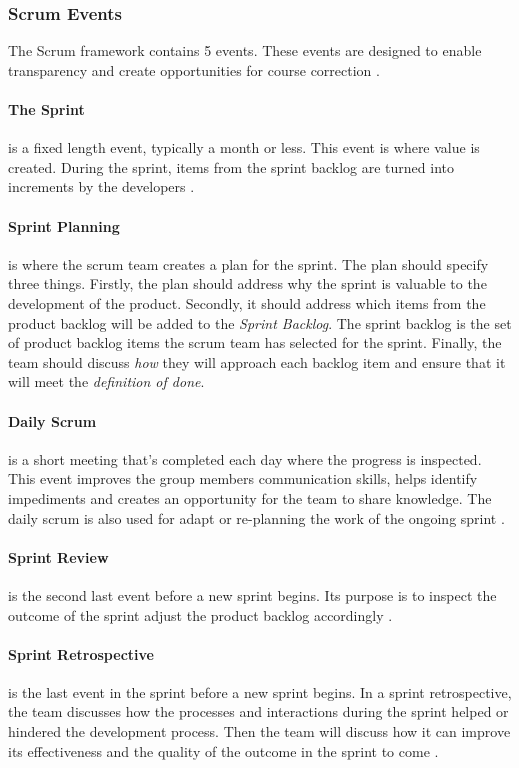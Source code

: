 \subsubsection{Scrum Events}
The Scrum framework contains 5 events. These events are designed to enable transparency and create opportunities for course correction  \cite{schwaber_sutherland_2022}.

\paragraph{The Sprint}
is a fixed length event, typically a month or less. This event is where value is created. During the sprint, items from the sprint backlog are turned into increments by the developers \cite{schwaber_sutherland_2022}.

\paragraph{Sprint Planning}
is where the scrum team creates a plan for the sprint. The plan should specify three things. Firstly, the plan should address why the sprint is valuable to the development of the product. Secondly, it should address which items from the product backlog will be added to the \emph{Sprint Backlog}. The sprint backlog is the set of product backlog items the scrum team has selected for the sprint. Finally, the team should discuss \emph{how} they will approach each backlog item and ensure that it will meet the \emph{definition of done}.


\paragraph{Daily Scrum}
is a short meeting that's completed each day where the progress is inspected.
This event improves the group members communication skills, helps identify impediments and creates an opportunity for the team to share knowledge.
The daily scrum is also used for adapt or re-planning the work of the ongoing sprint \cite{schwaber_sutherland_2022}.

\paragraph{Sprint Review}
is the second last event before a new sprint begins.
Its purpose is to inspect the outcome of the sprint adjust the product backlog accordingly \cite{schwaber_sutherland_2022}.

\paragraph{Sprint Retrospective}
is the last event in the sprint before a new sprint begins. In a sprint retrospective, the team discusses how the processes and interactions during the sprint helped or hindered the development process. Then the team will discuss how it can improve its effectiveness and the quality of the outcome in the sprint to come \cite{schwaber_sutherland_2022}.
